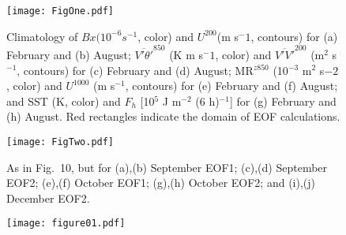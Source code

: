 \documentclass{ametsocV5}
\begin{document}

\begin{figure}[t]
\centerline{\texttt{[image: FigOne.pdf]}}

\caption{Climatology of $Bx (10^{-6} s^{-1}$, color) and $U^{200}$(m s$^-1$,
contours) for (a) February and (b) August; $\overline{V'\theta'}^{850}$
(K m s$^-1$, color) and 
$\overline{V'V'}^{200}$
(m$^2$ s$^{-1}$, contours) for (c) February and (d) August; MR$^{z850}$ 
(10$^{-3}$ m$^2$ s$-2$, color) and $U^{1000}$ (m s$^{-1}$, contours) 
for (e) February and (f) August;
and SST (K, color) and $F_h$ [10$^5$ J m$^{-2}$ (6 h)$^{-1}$] for (g)
February and (h) August. Red rectangles indicate the domain of EOF
calculations.} \label{fig1} 
\end{figure}

\begin{figure}[p]
\centerline{\texttt{[image: FigTwo.pdf]}}
\caption{As in Fig.~10, but for (a),(b) September EOF1; (c),(d) September EOF2; (e),(f) October EOF1; (g),(h) October EOF2; and
(i),(j) December EOF2.}
\end{figure}

\begin{figure}
 \centerline{\texttt{[image: figure01.pdf]}}
\end{figure}
\end{document}
